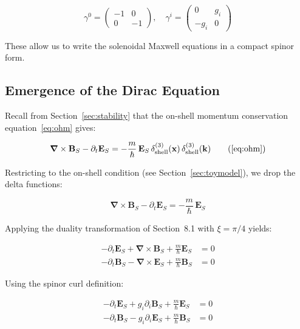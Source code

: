 \documentclass {article}
\renewcommand\vec{\mathbf}
\let\OldS\nabla
\renewcommand{\nabla}{\boldsymbol{\OldS}}
\begin{document}
\begin{equation}
\gamma^0 = \begin{pmatrix}
-1 & 0 \\
0 & -1
\end{pmatrix}, \quad
\gamma^i = \begin{pmatrix}
0 & g_i \\
-g_i & 0
\end{pmatrix}
\end{equation}

\noindent These allow us to write the solenoidal Maxwell equations in a compact spinor form.

\subsection{Emergence of the Dirac Equation}

Recall from Section~\ref{sec:stability} that the on-shell momentum conservation equation~\eqref{eq:ohm} gives:

\begin{equation}
\nabla \times \vec{B}_S - \partial_t \vec{E}_S = -\frac{m}{\hbar}\, \vec{E}_S\, \delta^{(3)}_{\text{shell}}(\vec{x})\, \delta^{(3)}_{\text{shell}}(\vec{k})
\tag{\ref{eq:ohm}}
\end{equation}

Restricting to the on-shell condition (see Section~\ref{sec:toymodel}), we drop the delta functions:

\begin{equation}
\nabla \times \vec{B}_S - \partial_t \vec{E}_S = -\frac{m}{\hbar}\, \vec{E}_S
\end{equation}


\noindent Applying the duality transformation of Section~8.1 with $\xi = \pi/4$ yields:


\begin{equation}
\begin{aligned}
-\partial_t \vec{E}_S + \nabla \times \vec{B}_S + \frac{m}{\hbar} \vec{E}_S &= 0 \\
-\partial_t \vec{B}_S - \nabla \times \vec{E}_S + \frac{m}{\hbar} \vec{B}_S &= 0
\end{aligned}
\end{equation}

\noindent Using the spinor curl definition:

\begin{equation}
\begin{aligned}
-\partial_t \vec{E}_S + g_i \partial_i \vec{B}_S + \frac{m}{\hbar} \vec{E}_S &= 0 \\
-\partial_t \vec{B}_S - g_i \partial_i \vec{E}_S + \frac{m}{\hbar} \vec{B}_S &= 0
\end{aligned}
\end{equation}
\end{document}
